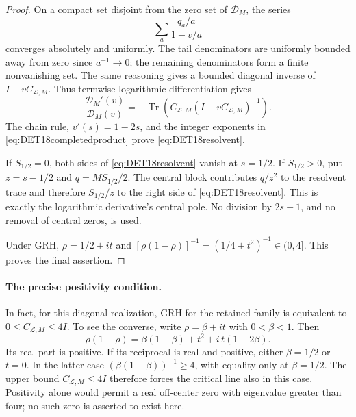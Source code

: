 \documentclass[11pt,a4paper]{article}
\newcommand{\Tr}{\operatorname{Tr}}
\begin{document}
\begin{proof}
On a compact set disjoint from the zero set of $\mathscr D_M$,
the series
\[
 \sum_a \frac{q_a/a}{1-v/a}
\]
converges absolutely and uniformly. The tail denominators are
uniformly bounded away from zero since $a^{-1}\to0$; the remaining
denominators form a finite nonvanishing set. The same reasoning
gives a bounded diagonal inverse of $I-vC_{\mathcal L,M}$.
Thus termwise logarithmic differentiation gives
\[
 \frac{\mathscr D_M'(v)}{\mathscr D_M(v)}
 =-\Tr\!\left(C_{\mathcal L,M}(I-vC_{\mathcal L,M})^{-1}\right).
\]
The chain rule, $v'(s)=1-2s$, and the integer exponents in
\eqref{eq:DET18completedproduct} prove
\eqref{eq:DET18resolvent}.

If $S_{1/2}=0$, both sides of \eqref{eq:DET18resolvent} vanish at
$s=1/2$. If $S_{1/2}>0$, put $z=s-1/2$ and
$q=MS_{1/2}/2$. The central block contributes $q/z^2$ to the
resolvent trace and therefore $S_{1/2}/z$ to the right side of
\eqref{eq:DET18resolvent}. This is exactly the logarithmic
derivative's central pole. No division by $2s-1$, and no removal
of central zeros, is used.

Under GRH, $\rho=1/2+it$ and
$[\rho(1-\rho)]^{-1}=(1/4+t^2)^{-1}\in(0,4]$.
This proves the final assertion.
\end{proof}

\paragraph{The precise positivity condition.}
In fact, for this diagonal realization, GRH for the retained family
is equivalent to $0\le C_{\mathcal L,M}\le4I$.
To see the converse, write $\rho=\beta+it$ with $0<\beta<1$.
Then
\[
 \rho(1-\rho)=\beta(1-\beta)+t^2+i\,t(1-2\beta).
\]
Its real part is positive. If its reciprocal is real and positive,
either $\beta=1/2$ or $t=0$. In the latter case
$(\beta(1-\beta))^{-1}\ge4$, with equality only at $\beta=1/2$.
The upper bound $C_{\mathcal L,M}\le4I$ therefore forces the
critical line also in this case. Positivity alone would permit a
real off-center zero with eigenvalue greater than four; no such zero
is asserted to exist here.
\end{document}
